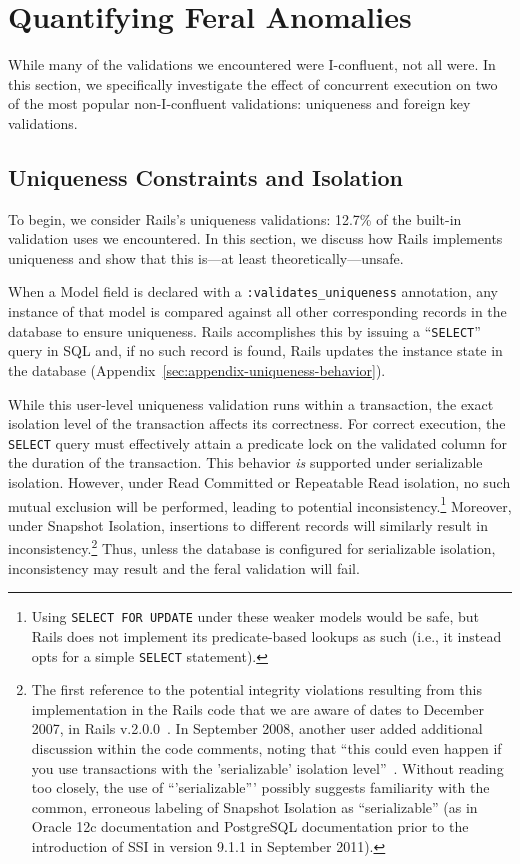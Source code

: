 
\section{Quantifying Feral Anomalies}
\label{sec:evaluation}

While many of the validations we encountered were I-confluent,
not all were. In this section, we specifically investigate the effect
of concurrent execution on two of the most popular non-I-confluent
validations: uniqueness and foreign key validations.

\subsection{Uniqueness Constraints and Isolation}

To begin, we consider Rails's uniqueness validations: 12.7\% of the
built-in validation uses we encountered. In this section, we discuss
how Rails implements uniqueness and show that this is---at least
theoretically---unsafe.

When a Model field is declared with a \texttt{:validates\_uniqueness}
annotation, any instance of that model is compared against all other
corresponding records in the database to ensure uniqueness. Rails
accomplishes this by issuing a ``\texttt{SELECT}'' query in SQL and,
if no such record is found, Rails updates the instance state in the
database (Appendix~\ref{sec:appendix-uniqueness-behavior}).

While this user-level uniqueness validation runs within a transaction,
the exact isolation level of the transaction affects its
correctness. For correct execution, the \texttt{SELECT} query must
effectively attain a predicate lock on the validated column for the
duration of the transaction. This behavior \textit{is} supported under
serializable isolation. However, under Read Committed or Repeatable
Read isolation, no such mutual exclusion will be performed, leading to
potential inconsistency.\footnote{Using \texttt{SELECT FOR UPDATE}
  under these weaker models would be safe, but Rails does not
  implement its predicate-based lookups as such (i.e., it instead opts
  for a simple \texttt{SELECT} statement).}  Moreover, under Snapshot Isolation,
insertions to different records will similarly result in
inconsistency.\footnote{The first reference to the potential integrity
  violations resulting from this implementation in the Rails code that
  we are aware of dates to December 2007, in Rails
  v.2.0.0~\cite{code-unique-race-one}.  In September 2008, another
  user added additional discussion within the code comments, noting
  that ``this could even happen if you use transactions with the
  'serializable' isolation
  level''~\cite{code-unique-race-two}. Without reading too closely,
  the use of ``'serializable''' possibly suggests familiarity with the
  common, erroneous labeling of Snapshot Isolation as ``serializable''
  (as in Oracle 12c documentation and PostgreSQL documentation prior
  to the introduction of SSI in version 9.1.1 in September
  2011)\label{fn:si-rails}. } Thus, unless the database is configured
for serializable isolation, inconsistency may result and the feral
validation will fail.

